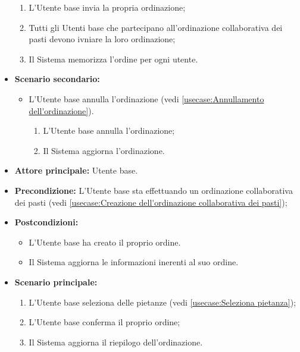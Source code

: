 \begin{itemize}
\begin{enumerate}
		      \item L'Utente base invia la propria ordinazione;

		      \item Tutti gli Utenti base che partecipano all'ordinazione collaborativa dei pasti devono
		            ivniare la loro ordinazione;
		      \item Il Sistema memorizza l'ordine per ogni utente.
	      \end{enumerate}

	\item \textbf{Scenario secondario:}
	      \begin{itemize}
		      \item L'Utente base annulla l'ordinazione (vedi
		            \autoref{usecase:Annullamento dell'ordinazione}).
		            \begin{enumerate}
			            \item L'Utente base annulla l'ordinazione;
			            \item Il Sistema aggiorna l'ordinazione.
		            \end{enumerate}
	      \end{itemize}
\end{itemize}


\label{usecase:Creazione della propria ordinazione}
\begin{itemize}
	\item \textbf{Attore principale:} Utente base.

	\item \textbf{Precondizione:} L'Utente base sta effettuando un ordinazione collaborativa dei pasti (vedi \autoref{usecase:Creazione dell'ordinazione collaborativa dei pasti});

	\item \textbf{Postcondizioni:}
	      \begin{itemize}
		      \item L'Utente base ha creato il proprio ordine.
		      \item Il Sistema aggiorna le informazioni inerenti al suo ordine.
	      \end{itemize}

	\item \textbf{Scenario principale:}
	      \begin{enumerate}
		      \item L'Utente base seleziona delle pietanze (vedi \autoref{usecase:Seleziona pietanza});
		      \item L'Utente base conferma il proprio ordine;
		      \item Il Sistema aggiorna il riepilogo dell'ordinazione.
	      \end{enumerate}
\end{itemize}


